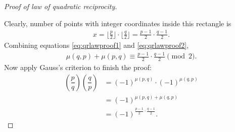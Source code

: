 \documentclass{subfile}
\begin{document}
\begin{proof}[Proof of law of quadratic reciprocity]
\begin{center}
	\end{center}
	Clearly, number of points with integer coordinates inside this rectangle is
	\begin{align}\label{eq:qrlawproof2}
	x=\Big\lfloor\frac{p}{2} \Big\rfloor \cdot \Big\lfloor\frac{q}{2} \Big\rfloor = \frac{p-1}{2}\cdot\frac{q-1}{2}.
	\end{align}
	Combining equations \eqref{eq:qrlawproof1} and \eqref{eq:qrlawproof2},
	\begin{align*}
	\mu(q,p)+\mu(p,q) \equiv \frac{p-1}{2}\cdot\frac{q-1}{2} \pmod 2.
	\end{align*}
	Now apply Gauss's criterion to finish the proof:
	\begin{align*}
	\left(\dfrac{p}{q}\right)\left(\dfrac{q}{p}\right) &=(-1)^{\mu(p,q)} \cdot (-1)^{\mu(q,p)} \\
	&= (-1)^{\mu(p,q)+\mu(q,p)}\\
	&=(-1)^{\frac{p-1}{2}\cdot\frac{q-1}{2}}.
	\end{align*}
\end{proof}
\end{document}
